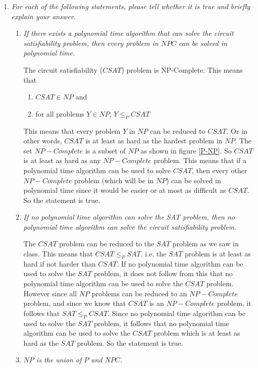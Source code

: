 \documentclass[paper=a4, fontsize=11pt]{scrartcl} %
\numberwithin{equation}{section} %
\numberwithin{figure}{section} %
\numberwithin{table}{section} %
\begin{document}
\begin{enumerate}
  \item \textit{For each of the following statements, please tell whether it is true and briefly explain your answer.}
  \begin{enumerate}
    \item \textit{If there exists a polynomial time algorithm that can solve the circuit satisfiability problem, then every problem in $NPC$ can be solved in polynomial time.}
    
The circuit satisfiability ($CSAT$) problem is NP-Complete. This means that
\begin{enumerate}
\item $CSAT \in NP$ and
\item for all problems $Y \in NP$, $Y \leq_P CSAT$ 
\end{enumerate}
This means that every problem $Y$ in $NP$ can be reduced to $CSAT$. Or in other words, $CSAT$ is at least as hard as the hardest problem in $NP$. The set $NP-Complete$ is a subset of $NP$ as shown in figure \ref{P-NP}. So $CSAT$ is at least as hard as any $NP-Complete$ problem. This means that if a polynomial time algorithm can be used to solve $CSAT$, then every other $NP-Complete$ problem (which will be in $NP$) can be solved in polynomial time since it would be easier or at most as difficult as $CSAT$. So the statement is true.

    \item \textit{If no polynomial time algorithm can solve the SAT problem, then no polynomial time algorithm can solve the circuit satisfiability problem.}
    
    The $CSAT$ problem can be reduced to the $SAT$ problem as we saw in class. This means that $CSAT \leq_P SAT$. i.e. the $SAT$ problem is at least as hard if not harder than $CSAT$. If no polynomial time algorithm can be used to solve the $SAT$ problem, it does not follow from this that no polynomial time algorithm can be used to solve the $CSAT$ problem. However since all $NP$ problems can be reduced to an $NP-Complete$ problem, and since we know that $CSAT$ is an $NP-Complete$ problem, it follows that $SAT \leq_P CSAT$. Since no polynomial time algorithm can be used to solve the $SAT$ problem, it follows that no polynomial time algorithm can be used to solve the $CSAT$ problem which is at least as hard as the $SAT$ problem. So the statement is true.
    
    \item \textit{$NP$ is the union of $P$ and $NPC$.}
    

\end{enumerate}
\end{enumerate}
\end{document}
